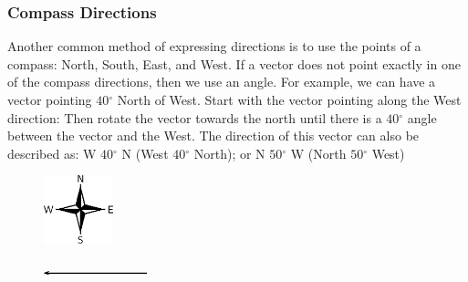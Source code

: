             \subsubsection{ Compass Directions}
            \nopagebreak
        \label{m38812*id187246}Another common method of expressing directions is to use the points of a compass: North, South, East, and West.
If a vector does not point exactly in one of the compass directions, then we use an angle. For example, we can have a vector pointing $40{}^{\circ }$ North of West. Start with the vector pointing along the West direction:
Then rotate the vector towards the north until there is a $40{}^{\circ }$ angle between the vector and the West.
The direction of this vector can also be described as: W $40{}^{\circ }$ N (West $40{}^{\circ }$ North); or N $50{}^{\circ }$ W (North $50{}^{\circ }$ West)
    \setcounter{subfigure}{0}
	\begin{figure}[H] %
    \begin{center}
    \label{m38812*id187349!!!underscore!!!media}\label{m38812*id187349!!!underscore!!!printimage}\includegraphics[width=2cm]{col11305.imgs/m38812_PG11C1_003.png} %
      \vspace{2pt}
    \vspace{.1in}
    \end{center}
 \end{figure}       
    \setcounter{subfigure}{0}
	\begin{figure}[H] %
    \begin{center}
    \label{m38812*id187358!!!underscore!!!media}\label{m38812*id187358!!!underscore!!!printimage}\includegraphics[width=3cm]{col11305.imgs/m38812_PG11C1_004.png} %
      \vspace{2pt}
    \vspace{.1in}
    \end{center}
 \end{figure}       
    \setcounter{subfigure}{0}
